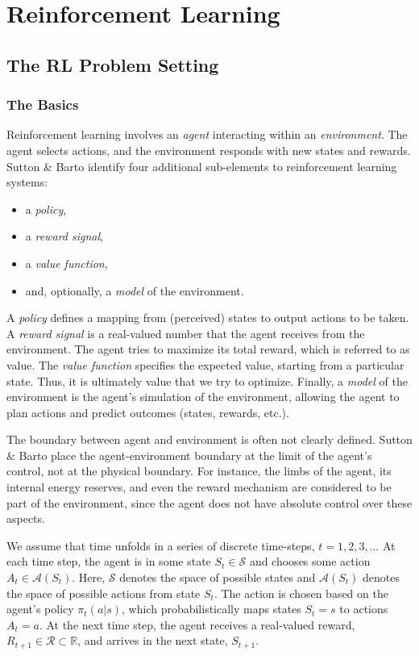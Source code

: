 \chapter{Reinforcement Learning}

\section{The RL Problem Setting}

\subsection{The Basics}

Reinforcement learning involves an \textit{agent} interacting within an \textit{environment}. The agent selects actions, and the environment responds with new states and rewards. Sutton \& Barto \cite{sutton1998reinforcement} identify four additional sub-elements to reinforcement learning systems:
\begin{itemize}
	\item a \textit{policy},
	\item a \textit{reward signal},
	\item a \textit{value function},
	\item and, optionally, a \textit{model} of the environment.
\end{itemize}
\noindent A \textit{policy} defines a mapping from (perceived) states to output actions to be taken. A \textit{reward signal} is a real-valued number that the agent receives from the environment. The agent tries to maximize its total reward, which is referred to as value. The \textit{value function} specifies the expected value, starting from a particular state. Thus, it is ultimately value that we try to optimize. Finally, a \textit{model} of the environment is the agent's simulation of the environment, allowing the agent to plan actions and predict outcomes (states, rewards, etc.).

The boundary between agent and environment is often not clearly defined. Sutton \& Barto place the agent-environment boundary at the limit of the agent's control, not at the physical boundary. For instance, the limbs of the agent, its internal energy reserves, and even the reward mechanism are considered to be part of the environment, since the agent does not have absolute control over these aspects.

We assume that time unfolds in a series of discrete time-steps, $t = 1, 2, 3, \dots$ At each time step, the agent is in some state $S_t \in \mathcal{S}$ and chooses some action $A_t \in \mathcal{A} (S_t)$. Here, $\mathcal{S}$ denotes the space of possible states and $\mathcal{A} (S_t)$ denotes the space of possible actions from state $S_t$. The action is chosen based on the agent's policy $\pi_t (a | s)$, which probabilistically maps states $S_t = s$ to actions $A_t = a$. At the next time step, the agent receives a real-valued reward, $R_{t+1} \in \mathcal{R} \subset \mathbb{R}$, and arrives in the next state, $S_{t+1}$.

